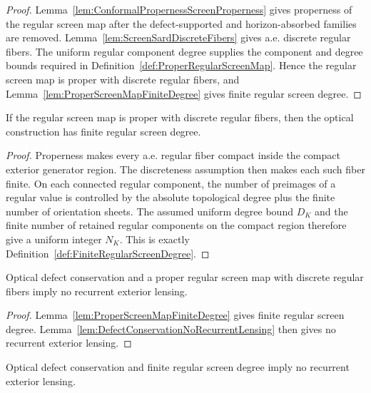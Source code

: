 \begin{proof}
Lemma~\ref{lem:ConformalPropernessScreenProperness} gives properness of the regular screen map after the defect-supported and horizon-absorbed families are removed. Lemma~\ref{lem:ScreenSardDiscreteFibers} gives a.e. discrete regular fibers. The uniform regular component degree supplies the component and degree bounds required in Definition~\ref{def:ProperRegularScreenMap}. Hence the regular screen map is proper with discrete regular fibers, and Lemma~\ref{lem:ProperScreenMapFiniteDegree} gives finite regular screen degree.
\end{proof}

\begin{lemma}\label{lem:ProperScreenMapFiniteDegree}
If the regular screen map is proper with discrete regular fibers, then the optical construction has finite regular screen degree.
\end{lemma}

\begin{proof}
Properness makes every a.e. regular fiber compact inside the compact exterior generator region. The discreteness assumption then makes each such fiber finite. On each connected regular component, the number of preimages of a regular value is controlled by the absolute topological degree plus the finite number of orientation sheets. The assumed uniform degree bound $D_K$ and the finite number of retained regular components on the compact region therefore give a uniform integer $N_K$. This is exactly Definition~\ref{def:FiniteRegularScreenDegree}.
\end{proof}

\begin{corollary}\label{cor:ProperScreenNoRecurrentLensing}
Optical defect conservation and a proper regular screen map with discrete regular fibers imply no recurrent exterior lensing.
\end{corollary}

\begin{proof}
Lemma~\ref{lem:ProperScreenMapFiniteDegree} gives finite regular screen degree. Lemma~\ref{lem:DefectConservationNoRecurrentLensing} then gives no recurrent exterior lensing.
\end{proof}

\begin{lemma}\label{lem:DefectConservationNoRecurrentLensing}
Optical defect conservation and finite regular screen degree imply no recurrent exterior lensing.
\end{lemma}

